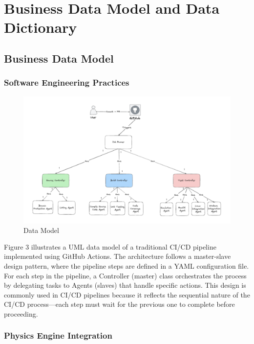 \documentclass[12pt]{article}
\begin{document}
\section{Business Data Model and Data Dictionary}
\subsection{Business Data Model}
\subsubsection{Software Engineering Practices}

\begin{figure}[ht!]
  \begin{center}
   \includegraphics[scale=0.5]{DataModel.png}
  \caption{Data Model}
  \label{Fig_DataModel} 
  \end{center}
\end{figure}

\clearpage

Figure 3 illustrates a UML data model of a traditional CI/CD pipeline implemented using GitHub Actions. The architecture follows a master-slave design pattern, where the pipeline steps are defined in a YAML configuration file. For each step in the pipeline, a Controller (master) class orchestrates the process by delegating tasks to Agents (slaves) that handle specific actions. This design is commonly used in CI/CD pipelines because it reflects the sequential nature of the CI/CD process—each step must wait for the previous one to complete before proceeding.

\subsubsection{Physics Engine Integration}
\end{document}
